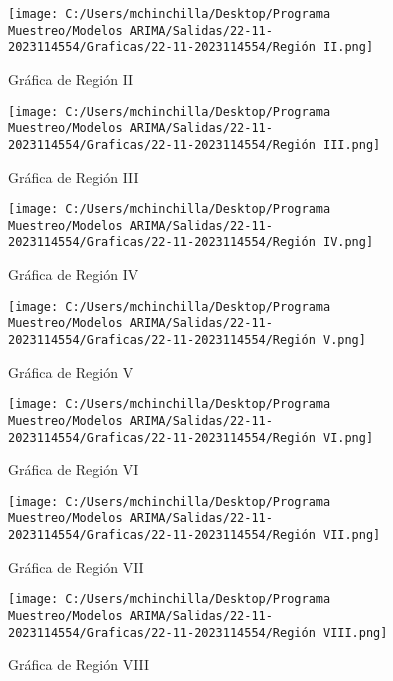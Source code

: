 \documentclass{article}%
\begin{document}
%


\begin{figure}[H]%
\centering%
\texttt{[image: C:/Users/mchinchilla/Desktop/Programa Muestreo/Modelos ARIMA/Salidas/22-11-2023114554/Graficas/22-11-2023114554/Región II.png]}%
\caption{Gráfica de Región II}%
\end{figure}

%


\begin{figure}[H]%
\centering%
\texttt{[image: C:/Users/mchinchilla/Desktop/Programa Muestreo/Modelos ARIMA/Salidas/22-11-2023114554/Graficas/22-11-2023114554/Región III.png]}%
\caption{Gráfica de Región III}%
\end{figure}

%


\begin{figure}[H]%
\centering%
\texttt{[image: C:/Users/mchinchilla/Desktop/Programa Muestreo/Modelos ARIMA/Salidas/22-11-2023114554/Graficas/22-11-2023114554/Región IV.png]}%
\caption{Gráfica de Región IV}%
\end{figure}

%


\begin{figure}[H]%
\centering%
\texttt{[image: C:/Users/mchinchilla/Desktop/Programa Muestreo/Modelos ARIMA/Salidas/22-11-2023114554/Graficas/22-11-2023114554/Región V.png]}%
\caption{Gráfica de Región V}%
\end{figure}

%


\begin{figure}[H]%
\centering%
\texttt{[image: C:/Users/mchinchilla/Desktop/Programa Muestreo/Modelos ARIMA/Salidas/22-11-2023114554/Graficas/22-11-2023114554/Región VI.png]}%
\caption{Gráfica de Región VI}%
\end{figure}

%


\begin{figure}[H]%
\centering%
\texttt{[image: C:/Users/mchinchilla/Desktop/Programa Muestreo/Modelos ARIMA/Salidas/22-11-2023114554/Graficas/22-11-2023114554/Región VII.png]}%
\caption{Gráfica de Región VII}%
\end{figure}

%


\begin{figure}[H]%
\centering%
\texttt{[image: C:/Users/mchinchilla/Desktop/Programa Muestreo/Modelos ARIMA/Salidas/22-11-2023114554/Graficas/22-11-2023114554/Región VIII.png]}%
\caption{Gráfica de Región VIII}%
\end{figure}
\end{document}
